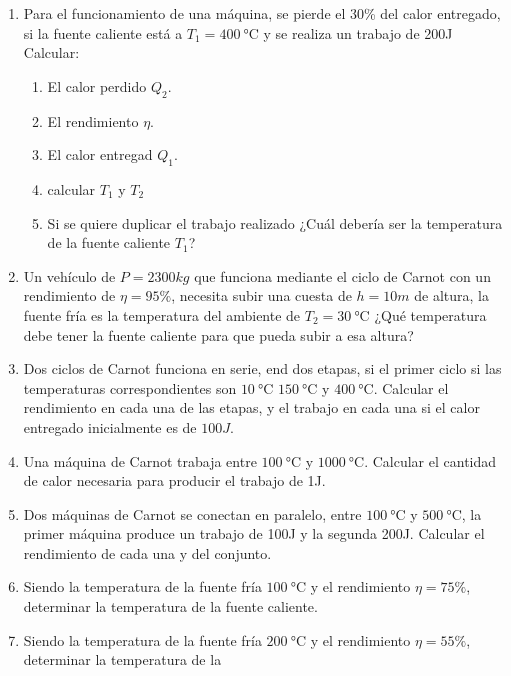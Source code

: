 \documentclass[../main]{subfiles}
\begin{document}
\begin{enumerate}
    $\eta_{\%}=10\%$ Si produce un trabajo de W=1000J, estando la
    fuente fría a $T_2=\SI{10}{\celsius}$. Calcular los calores
    entregados y recibidos $Q_1,Q_2$, la temperatura de la fuente
    caliente $T_1$.
  \item Para el funcionamiento de una máquina, se pierde el 30\% del
    calor entregado, si la fuente caliente está a
    $T_1=\SI{400}{\celsius}$ y se realiza un trabajo de 200J Calcular:
    \begin{enumerate}
      \item El calor perdido $Q_2$.
      \item El rendimiento $\eta$.
      \item El calor entregad $Q_1$.
      \item calcular $T_1$ y $T_2$
      \item Si se quiere duplicar el trabajo realizado ¿Cuál debería
        ser la temperatura de la fuente caliente $T_1$?
    \end{enumerate}
  \item Un vehículo de $P=2300kg$ que funciona mediante el ciclo de
    Carnot con un rendimiento de $\eta=95\%$, necesita subir una
    cuesta de $h=10m$ de altura, la fuente fría es la temperatura del
    ambiente de $T_2=\SI{30}{\celsius}$ ¿Qué temperatura debe tener
    la fuente caliente para que pueda subir a esa altura?
  \item Dos ciclos de Carnot funciona en serie, end dos etapas, si el
    primer ciclo si las temperaturas correspondientes son
    $\SI{10}{\celsius}$ $\SI{150}{\celsius}$ y $\SI{400}{\celsius}$.
    Calcular el rendimiento en cada una de las etapas, y el trabajo
    en cada una si el calor entregado inicialmente es de $100J$.
  \item Una máquina de Carnot trabaja entre $\SI{100}{\celsius}$ y
    $\SI{1000}{\celsius}$. Calcular el  cantidad de calor necesaria
    para producir el trabajo de 1J.
  \item Dos máquinas de Carnot se conectan en paralelo, entre
    $\SI{100}{\celsius}$ y $\SI{500}{\celsius}$, la primer máquina
    produce un trabajo de 100J y la segunda 200J. Calcular el
    rendimiento de cada una y del conjunto.
  \item Siendo la temperatura de la fuente fría $\SI{100}{\celsius}$
    y el rendimiento $\eta=75\%$, determinar la temperatura de la
    fuente caliente.
  \item Siendo la temperatura de la fuente fría $\SI{200}{\celsius}$
    y el rendimiento $\eta=55\%$, determinar la temperatura de la

\end{enumerate}
\end{document}
